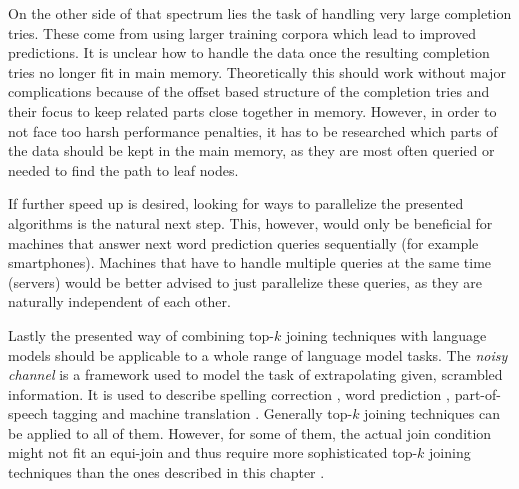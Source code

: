 On the other side of that spectrum lies the task of handling very large
completion tries.
These come from using larger training corpora which lead to improved
predictions.
It is unclear how to handle the data once the resulting completion tries no
longer fit in main memory.
Theoretically this should work without major complications because of the offset
based structure of the completion tries and their focus to keep related parts
close together in memory.
However, in order to not face too harsh performance penalties, it has to
be researched which parts of the data should be kept in the main memory, as they
are most often queried or needed to find the path to leaf nodes.

If further speed up is desired, looking for ways to parallelize the presented
algorithms is the natural next step.
This, however, would only be beneficial for machines that answer next word
prediction queries sequentially (for example smartphones).
Machines that have to handle multiple queries at the same time (servers) would
be better advised to just parallelize these queries, as they are naturally
independent of each other.

Lastly the presented way of combining top-$k$ joining techniques with language
models should be applicable to a whole range of language model tasks.
The \emph{noisy channel} \parencite{Shannon1948} is a framework used to model
the task of extrapolating given, scrambled information.
It is used to describe spelling correction
\parencite{JurafskyMartin2009,Manning2008,Kernighan1990,Mays1991},
word prediction \parencite{Bickel2005}, part-of-speech tagging
\parencite{Church1988} and machine translation \parencite{Brown1990}.
Generally top-$k$ joining techniques can be applied to all of them.
However, for some of them, the actual join condition might not fit an equi-join
and thus require more sophisticated top-$k$ joining techniques than the ones
described in this chapter \parencite{Ilyas2004}.

